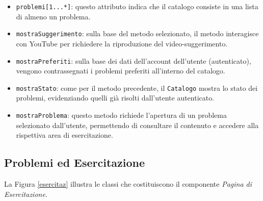 \documentclass[11pt, a4paper]{article}
\theoremstyle{definition} %
\begin{document}
\begin{itemize}
    \item \texttt{problemi[1...*]}: questo attributo indica che il catalogo
    consiste in una lista di almeno un problema.

    \item \texttt{mostraSuggerimento}: sulla base del metodo selezionato, il metodo
    interagisce con YouTube per richiedere la riproduzione del video-suggerimento.

    \item \texttt{mostraPreferiti}: sulla base dei dati dell'account
    dell'utente (autenticato), vengono contrassegnati i problemi preferiti
    all'interno del catalogo.

    \item \texttt{mostraStato}: come per il metodo precedente, il
    \texttt{Catalogo} mostra lo stato dei problemi, evidenziando quelli
    già risolti dall'utente autenticato.

    \item \texttt{mostraProblema}: questo metodo richiede l'apertura
    di un problema selezionato dall'utente, permettendo di consultare il
    contenuto e accedere alla rispettiva area di esercitazione.
\end{itemize}



\newpage
\subsection{Problemi ed Esercitazione}
La Figura \ref{esercitaz} illustra le classi che costituiscono il componente
\textit{Pagina di Esercitazione}.
\end{document}
